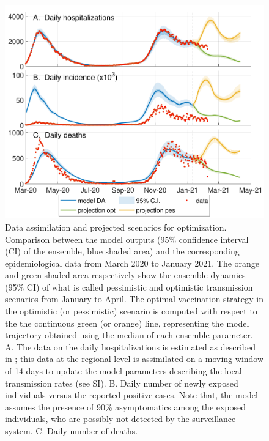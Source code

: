 \begin{figure}[!ht]%
    \centering
    \includegraphics{fig_italy-ocp/figures/DA_italy1.pdf}
    \caption[Model fit with data assimilation and projected scenarios for optimization]{Data assimilation and projected scenarios for optimization. Comparison between the model outputs (95\% confidence interval (CI) of the ensemble, blue shaded area) and the corresponding epidemiological data from March 2020 to January 2021. The orange and green shaded area respectively show the ensemble dynamics (95\% CI) of what is called pessimistic and optimistic transmission scenarios from January to April. The optimal vaccination strategy in the optimistic (or pessimistic) scenario is computed with respect to the the continuous green (or orange) line, representing the model trajectory obtained using the median of each ensemble parameter. A. The data on the daily hospitalizations is estimated as described in \parencite{Bertuzzo:GeographyCOVID19Spread:2020}; this data at the regional level is assimilated on a moving window of 14 days to update the model parameters describing the local transmission rates (see SI). B. Daily number of newly exposed individuals versus the reported positive cases. Note that, the model assumes the presence of 90\% asymptomatics among the exposed individuals, who are possibly not detected by the surveillance system. C. Daily number of deaths. %
    }\label{fig:model_DA}
\end{figure}

